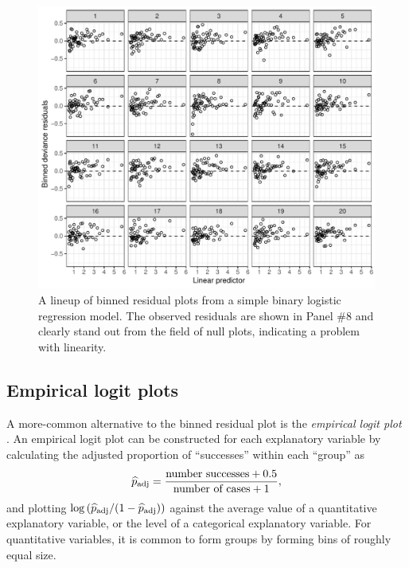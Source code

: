 \documentclass[12pt]{article}
\begin{document}
\begin{figure}
\centering
\includegraphics{figs/wells_binned_residuals.pdf}
\caption{\label{fig:binnedlineup} A lineup of binned residual plots from
a simple binary logistic regression model. The observed residuals are
shown in Panel \#8 and clearly stand out from the field of null plots,
indicating a problem with linearity.}
\end{figure}

\hypertarget{empirical-logit-plots}{%
\subsection{Empirical logit plots}\label{empirical-logit-plots}}

A more-common alternative to the binned residual plot is the
\emph{empirical logit plot} \citep[c.f.,][]{stat2, ramsey2013}. An
empirical logit plot can be constructed for each explanatory variable by
calculating the adjusted proportion of ``successes'' within each
``group'' as \[
\widehat{p}_{\rm adj} = \frac{\text{number successes} + 0.5}{\text{number of cases} + 1},
\] and plotting
\(\log\left(\widehat{p}_{\rm adj} / (1- \widehat{p}_{\rm adj}) \right)\)
against the average value of a quantitative explanatory variable, or the
level of a categorical explanatory variable. For quantitative variables,
it is common to form groups by forming bins of roughly equal size.
\end{document}
